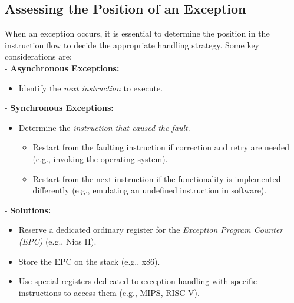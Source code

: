 \subsection{Assessing the Position of an Exception}
When an exception occurs, it is essential to determine the position in the instruction flow to decide the appropriate handling strategy. Some key considerations are: \\
- \textbf{Asynchronous Exceptions:}
\begin{itemize}
    \item Identify the \textit{next instruction} to execute.
\end{itemize}
- \textbf{Synchronous Exceptions:} \\
\begin{itemize}
    \item Determine the \textit{instruction that caused the fault}.
    \begin{itemize}
        \item Restart from the faulting instruction if correction and retry are needed (e.g., invoking the operating system).
        \item Restart from the next instruction if the functionality is implemented differently (e.g., emulating an undefined instruction in software).
    \end{itemize}
\end{itemize}
- \textbf{Solutions:} \\
\begin{itemize}
    \item Reserve a dedicated ordinary register for the \textit{Exception Program Counter (EPC)} (e.g., Nios II).
    \item Store the EPC on the stack (e.g., x86).
    \item Use special registers dedicated to exception handling with specific instructions to access them (e.g., MIPS, RISC-V).
\end{itemize}
